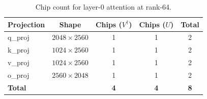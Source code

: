 \documentclass[12pt, a4paper]{article}
\begin{document}
\begin{table}[H]
\centering
\caption{Chip count for layer-0 attention at rank-64.}
\label{tab:chip_count}
\begin{tabular}{lcccc}
\toprule
\textbf{Projection} & \textbf{Shape} & \textbf{Chips ($V^\dagger$)} &
\textbf{Chips ($U$)} & \textbf{Total} \\
\midrule
q\_proj & $2048\times2560$ & 1 & 1 & 2 \\
k\_proj & $1024\times2560$ & 1 & 1 & 2 \\
v\_proj & $1024\times2560$ & 1 & 1 & 2 \\
o\_proj & $2560\times2048$ & 1 & 1 & 2 \\
\midrule
\textbf{Total} & & \textbf{4} & \textbf{4} & \textbf{8} \\
\bottomrule
\end{tabular}
\end{table}
\end{document}
